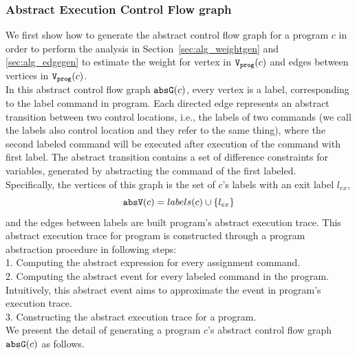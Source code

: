 \subsubsection{Abstract Execution Control Flow graph}
\label{sec:abscfg}
We first show how to generate the abstract control flow graph 
%
for a program $c$
in order to 
perform the analysis in Section~\ref{sec:alg_weightgen} and 
\ref{sec:alg_edgegen} to estimate 
the weight for vertex in $\mathtt{{V_{prog}}}(c)$ and edges between vertices in $\mathtt{{V_{prog}}}(c)$.
\\
In this 
abstract control flow graph $\mathtt{abs}{\mathtt{G}}(c)$, 
every 
vertex is a 
label,
 corresponding to the label command in program.
Each directed 
 edge represents an abstract transition 
 between two control locations, i.e., the labels of two commands (we call the labels also control location and they refer to the same thing), 
 where the second labeled command will be executed after execution of the command with first label.
 The abstract transition contains a set of difference constraints for variables, generated by abstracting the command of the first labeled.
\\
Specifically,
the vertices of this graph is the set of $c$'s labels with an exit label $l_{ex}$, 
\[ 
  \mathtt{abs}{\mathtt{V}}(c) = labels(c)\cup\{l_{ex}\}
  \]
and the edges between labels are built program's abstract execution trace.
This abstract execution trace for program is constructed through a program abstraction procedure in following steps:
\\
1. Computing the abstract expression for every assignment command.
\\
2. Computing the abstract event for every labeled command in the program. Intuitively, this abstract event aims 
to approximate the 
event in program's execution trace.
\\
3. Constructing the abstract execution trace for a program.
%
\\
We present the detail of generating a program $c$'s abstract control flow graph $\mathtt{abs}{\mathtt{G}}(c)$ as follows.
%
